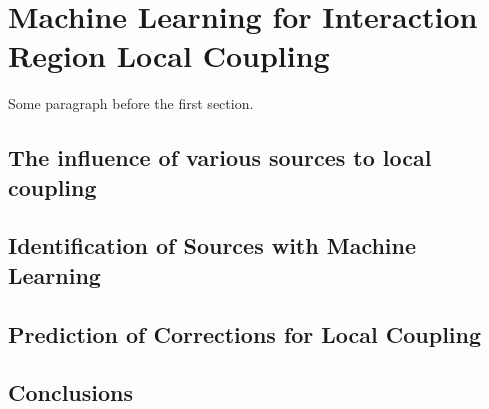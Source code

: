 
\chapter{Machine Learning for Interaction Region Local Coupling} %

\label{Chapter5} %




Some paragraph before the first section.


\section{The influence of various sources to local coupling}



\section{Identification of Sources with Machine Learning}



\section{Prediction of Corrections for Local Coupling}



\section{Conclusions}

